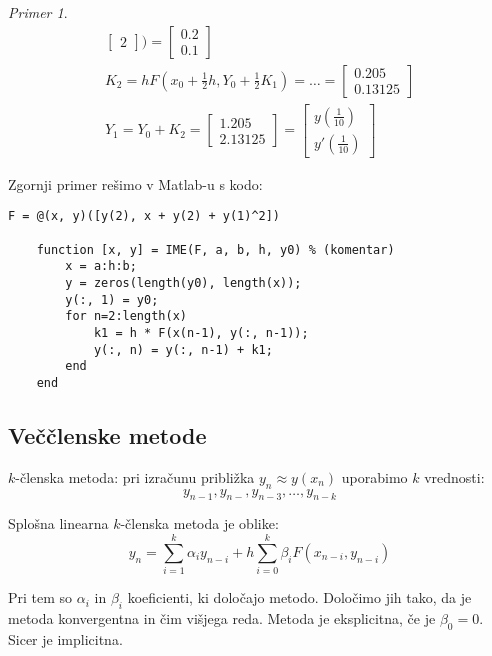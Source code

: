 \documentclass[a4paper,12pt]{article}
\theoremstyle{definition}
\theoremstyle{remark}
\newtheorem*{ex}{Primer}
\begin{document}
\begin{ex}
\begin{gather*}
\begin{bmatrix}
            2
        \end{bmatrix}) = \begin{bmatrix}
            0.2 \\
            0.1
        \end{bmatrix} \\
        K_2 = h F(x_0 + \frac{1}{2}h, Y_0 + \frac{1}{2} K_1) = \dots = \begin{bmatrix}
            0.205 \\
            0.13125
        \end{bmatrix} \\
        Y_1 = Y_0 + K_2 = \begin{bmatrix}
            1.205 \\
            2.13125
        \end{bmatrix} = \begin{bmatrix}
            y(\frac{1}{10}) \\
            y'(\frac{1}{10})
        \end{bmatrix}
    \end{gather*}
\end{ex}

Zgornji primer rešimo v Matlab-u s kodo:
\begin{lstlisting}[style=matlab, label=matlab-code]
    F = @(x, y)([y(2), x + y(2) + y(1)^2])
    
    function [x, y] = IME(F, a, b, h, y0) % (komentar)
        x = a:h:b;
        y = zeros(length(y0), length(x));
        y(:, 1) = y0;
        for n=2:length(x)
            k1 = h * F(x(n-1), y(:, n-1));
            y(:, n) = y(:, n-1) + k1;
        end
    end
    \end{lstlisting}
    

\subsection{Veččlenske metode}
$k$-členska metoda:
pri izračunu približka $y_n \approx y(x_n)$ uporabimo $k$ vrednosti:
\begin{equation*}
    y_{n-1}, y_{n-}, y_{n-3}, \dots, y_{n-k}
\end{equation*}

Splošna linearna $k$-členska metoda je oblike:
\begin{equation*}
    y_n = \sum_{i=1}^{k} \alpha_i y_{n-i} + h \sum_{i=0}^{k} \beta_i F(x_{n-i}, y_{n-i})
\end{equation*}

Pri tem so $\alpha_i$ in $\beta_i$ koeficienti, ki določajo metodo. Določimo jih tako, da je metoda konvergentna in čim višjega reda.
Metoda je eksplicitna, če je $\beta_0 = 0$. Sicer je implicitna.
\end{document}

